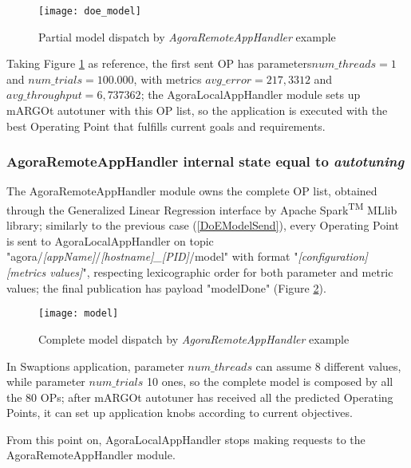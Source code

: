\begin{figure}[hb]

    \centering
    \texttt{[image: doe\_model]}
    \caption{Partial model dispatch by \textit{AgoraRemoteAppHandler} example}
    \label{fig:doe_model}
    
\end{figure}

Taking Figure \ref{fig:doe_model} as reference, the first sent OP has parameters\linebreak $num\_threads = 1$ and $num\_trials = 100.000$, with metrics $avg\_error = 217,3312$ and $avg\_throughput = 6,737362$; the AgoraLocalAppHandler module sets up mARGOt autotuner with this OP list, so the application is executed with the best Operating Point that fulfills current goals and requirements.


\subsubsection{AgoraRemoteAppHandler internal state equal to \textit{autotuning}}\label{modelSend}

The AgoraRemoteAppHandler module owns the complete OP list, obtained through the Generalized Linear Regression interface by A\-pach\-e Spark\textsuperscript{TM} MLlib library; similarly to the previous case (\ref{DoEModelSend}), every Operating Point is sent to AgoraLocalAppHandler on topic "agora\slash{}\textit{[app\-Name]}\slash{}\textit{[host\-name]\_[PID]}\slash{}model" with format "\textit{[configuration] [metrics values]}", respecting lexicographic order for both parameter and metric values; the final publication has payload "modelDone" (Figure \ref{fig:model}).

\begin{figure}[hb]

    \centering
    \texttt{[image: model]}
    \caption{Complete model dispatch by \textit{AgoraRemoteAppHandler} example}
    \label{fig:model}
    
\end{figure}

In Swaptions application, parameter $num\_threads$ can assume 8 different values, while parameter $num\_trials$ 10 ones, so the complete model is composed by all the 80 OPs; after mARGOt autotuner has received all the predicted Operating Points, it can set up application knobs according to current objectives.

From this point on, AgoraLocalAppHandler stops making requests to the AgoraRemoteAppHandler module.





